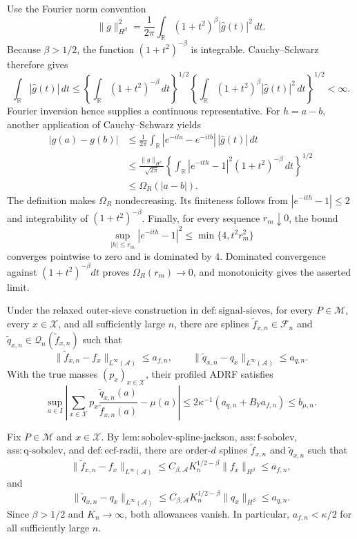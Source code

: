 Use the Fourier norm convention
\[
 \|g\|_{H^\beta}^2=\frac1{2\pi}
 \int_{\mathbb R}(1+t^2)^\beta|\widehat g(t)|^2\,dt.
\]
Because \(\beta>1/2\), the function \((1+t^2)^{-\beta}\) is integrable. Cauchy--Schwarz therefore gives
\[
 \int_{\mathbb R}|\widehat g(t)|\,dt
 \le
 \left\{\int_{\mathbb R}(1+t^2)^{-\beta}\,dt\right\}^{1/2}
 \left\{\int_{\mathbb R}(1+t^2)^\beta|\widehat g(t)|^2\,dt\right\}^{1/2}<\infty.
\]
Fourier inversion hence supplies a continuous representative. For \(h=a-b\), another application of Cauchy--Schwarz yields
\[
 \begin{aligned}
 |g(a)-g(b)|
 &\le \frac1{2\pi}\int_{\mathbb R}
       |e^{-ita}-e^{-itb}|\,|\widehat g(t)|\,dt\\
 &\le \frac{\|g\|_{H^\beta}}{\sqrt{2\pi}}
 \left\{\int_{\mathbb R}|e^{-ith}-1|^2(1+t^2)^{-\beta}\,dt\right\}^{1/2}\\
 &\le \Omega_R(|a-b|).
 \end{aligned}
\]
The definition makes \(\Omega_R\) nondecreasing. Its finiteness follows from \(|e^{-ith}-1|\le2\) and integrability of \((1+t^2)^{-\beta}\). Finally, for every sequence \(r_m\downarrow0\), the bound
\[
 \sup_{|h|\le r_m}|e^{-ith}-1|^2
 \le \min\{4,t^2r_m^2\}
\]
converges pointwise to zero and is dominated by \(4\). Dominated convergence against \((1+t^2)^{-\beta}dt\) proves \(\Omega_R(r_m)\to0\), and monotonicity gives the asserted limit.

Under the relaxed outer-sieve construction in \(\mathrm{def{:}signal\text{-}sieves}\), for every \(P\in\mathcal M\), every \(x\in\mathcal X\), and all sufficiently large \(n\), there are splines \(\widetilde f_{x,n}\in\mathscr F_n\) and \(\widetilde q_{x,n}\in\mathscr Q_n(\widetilde f_{x,n})\) such that
\[
 \|\widetilde f_{x,n}-f_x\|_{L^\infty(\mathcal A)}\le a_{f,n},
 \qquad
 \|\widetilde q_{x,n}-q_x\|_{L^\infty(\mathcal A)}\le a_{q,n}.
\]
With the true masses \((p_x)_{x\in\mathcal X}\), their profiled ADRF satisfies
\[
 \sup_{a\in I}\left|
 \sum_{x\in\mathcal X}p_x\frac{\widetilde q_{x,n}(a)}{\widetilde f_{x,n}(a)}-\mu(a)
 \right|
 \le 2\kappa^{-1}(a_{q,n}+B_Ya_{f,n})
 \le b_{\mu,n}.
\]

Fix \(P\in\mathcal M\) and \(x\in\mathcal X\). By \(\mathrm{lem{:}sobolev\text{-}spline\text{-}jackson}\), \(\mathrm{ass{:}f\text{-}sobolev}\), \(\mathrm{ass{:}q\text{-}sobolev}\), and \(\mathrm{def{:}ecf\text{-}radii}\), there are order-\(d\) splines \(\widetilde f_{x,n}\) and \(\widetilde q_{x,n}\) such that
\[
 \|\widetilde f_{x,n}-f_x\|_{L^\infty(\mathcal A)}
 \le C_{\beta,\mathcal A}K_n^{1/2-\beta}\|f_x\|_{H^\beta}
 \le a_{f,n},
\]
and
\[
 \|\widetilde q_{x,n}-q_x\|_{L^\infty(\mathcal A)}
 \le C_{\beta,\mathcal A}K_n^{1/2-\beta}\|q_x\|_{H^\beta}
 \le a_{q,n}.
\]
Since \(\beta>1/2\) and \(K_n\to\infty\), both allowances vanish. In particular, \(a_{f,n}<\kappa/2\) for all sufficiently large \(n\).

